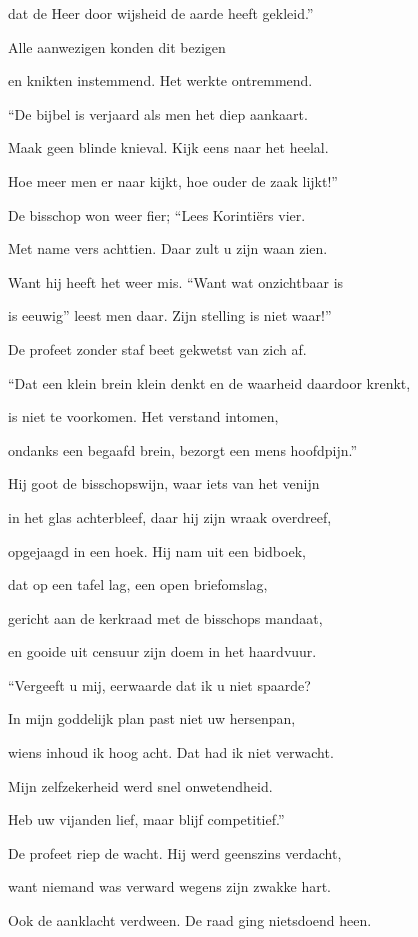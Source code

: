 dat de Heer door wijsheid
de aarde heeft gekleid.”

Alle aanwezigen
konden dit bezigen

en knikten instemmend.
Het werkte ontremmend.

“De bijbel is verjaard
als men het diep aankaart.

Maak geen blinde knieval.
Kijk eens naar het heelal.

Hoe meer men er naar kijkt,
hoe ouder de zaak lijkt!”

De bisschop won weer fier;
“Lees Korintiërs vier.

Met name vers achttien.
Daar zult u zijn waan zien.

Want hij heeft het weer mis.
“Want wat onzichtbaar is

is eeuwig” leest men daar.
Zijn stelling is niet waar!”

De profeet zonder staf
beet gekwetst van zich af.

“Dat een klein brein klein denkt
en de waarheid daardoor krenkt,

is niet te voorkomen.
Het verstand intomen,

ondanks een begaafd brein,
bezorgt een mens hoofdpijn.”

Hij goot de bisschopswijn,
waar iets van het venijn

in het glas achterbleef,
daar hij zijn wraak overdreef,

opgejaagd in een hoek.
Hij nam uit een bidboek,

dat op een tafel lag,
een open briefomslag,

gericht aan de kerkraad
met de bisschops mandaat,

en gooide uit censuur
zijn doem in het haardvuur.

“Vergeeft u mij, eerwaarde
dat ik u niet spaarde?

In mijn goddelijk plan
past niet uw hersenpan,

wiens inhoud ik hoog acht.
Dat had ik niet verwacht.

Mijn zelfzekerheid
werd snel onwetendheid.

Heb uw vijanden lief,
maar blijf competitief.”

De profeet riep de wacht.
Hij werd geenszins verdacht,

want niemand was verward
wegens zijn zwakke hart.

Ook de aanklacht verdween.
De raad ging nietsdoend heen.
